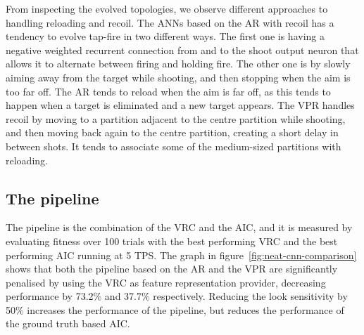 From inspecting the evolved topologies, we observe different approaches to handling reloading and recoil. The ANNs based on the AR with recoil has a tendency to evolve tap-fire in two different ways. The first one is having a negative weighted recurrent connection from and to the shoot output neuron that allows it to alternate between firing and holding fire. The other one is by slowly aiming away from the target while shooting, and then stopping when the aim is too far off. The AR tends to reload when the aim is far off, as this tends to happen when a target is eliminated and a new target appears. The VPR handles recoil by moving to a partition adjacent to the centre partition while shooting, and then moving back again to the centre partition, creating a short delay in between shots. It tends to associate some of the medium-sized partitions with reloading.



\subsection{The pipeline}
\label{sec:pipeline-results}

The pipeline is the combination of the VRC and the AIC, and it is measured by evaluating fitness over 100 trials with the best performing VRC and the best performing AIC running at 5 TPS. The graph in figure~\ref{fig:neat-cnn-comparison} shows that both the pipeline based on the AR and the VPR are significantly penalised by using the VRC as feature representation provider, decreasing performance by 73.2\% and 37.7\% respectively. Reducing the look sensitivity by 50\% increases the performance of the pipeline, but reduces the performance of the ground truth based AIC.





























































